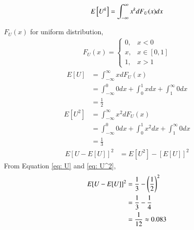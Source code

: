 \documentclass[journal,12pt,twocolumn]{IEEEtran}
\begin{document}
%
\begin{equation}
E{}\left[U^k\right] = \int_{-\infty}^{\infty}x^kdF_{U}(x)dx
\end{equation}

\solution

$F_U(x)$ for uniform distribution,
\begin{align}
    F_U(x) = \begin{cases}
    0, & x < 0 \\
    x, & x \in [0,1] \\
    1, & x > 1
    \end{cases}
\end{align}
\begin{align}
    E[U] &= \int_{-\infty}^{\infty} x dF_U(x) \\
    &= \int_{-\infty}^{0} 0 dx + \int_{0}^{1} x dx + \int_{1}^{\infty} 0 dx \\
    \label{eq: U}
    &= \frac{1}{2}
\end{align}
\begin{align}
    E[U^2] &= \int_{-\infty}^{\infty} x^2dF_U(x) \\
    &= \int_{-\infty}^{0} 0 dx + \int_{0}^{1} x^2 dx + \int_{1}^{\infty} 0 dx \\
    \label{eq: U^2}
    &= \frac{1}{3}
\end{align}
\begin{align}
    E[U-E[U]]^2 &= E[U^2] - [E[U]]^2
\end{align}
From Equation \eqref{eq: U} and \eqref{eq: U^2},
\begin{align}
    E[U-E[U]]^2 &= \frac{1}{3} - \left(\frac{1}{2}\right)^2 \\
    &= \frac{1}{3} - \frac{1}{4} \\
    &= \frac{1}{12} \approx 0.083
\end{align}
%
%
\end{document}
